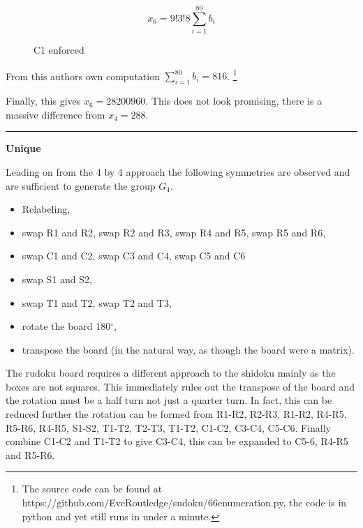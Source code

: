 \documentclass[a4paper,11pt]{report}
\newcounter{row}
\newcounter{col}
\newcommand\setrow[9]{
\setcounter{col}{1}
\foreach \n in {#1, #2, #3, #4, #5, #6, #7, #8, #9} {
\edef\x{\value{col} - 0.5}
\edef\y{9.5 - \value{row}}
\node[anchor=center] at (\x, \y) {\n};
\stepcounter{col}
}
\stepcounter{row}
}
\begin{document}
\begin{equation}x_6=9!3!8\sum^{80}_{i=1} b_i\end{equation}

\begin{figure}[h]
\centering
{}
\caption{C1 enforced}
\label{fig:64}
\end{figure}

From this authors own computation $\sum^{80}_{i=1} b_i=816$. \footnote{The source code can be found at https://github.com/EveRoutledge/sudoku/66enumeration.py, the code is in python and yet still runs in under a minute.}

Finally, this gives $x_6=28200960$. This does not look promising, there is a massive difference from $x_4=288$.

\noindent\rule{4cm}{0.4pt}

\textbf{Unique}

Leading on from the 4 by 4 approach the following symmetries are observed and are sufficient to generate the group $G_4$.
\begin{itemize}
\item Relabeling,
\item swap R1 and R2, swap R2 and R3, swap R4 and R5, swap R5 and R6,
\item swap C1 and C2, swap C3 and C4, swap C5 and C6
\item swap S1 and S2,
\item swap T1 and T2, swap T2 and T3,
\item rotate the board 180$^\circ$,
\item transpose the board (in the natural way, as though the board were a matrix).
\end{itemize}
The rudoku board requires a different approach to the shidoku mainly as the boxes are not squares. This immediately rules out the transpose of the board and the rotation must be a half turn not just a quarter turn. In fact, this can be reduced further the rotation can be formed from R1-R2, R2-R3, R1-R2, R4-R5, R5-R6, R4-R5, S1-S2, T1-T2, T2-T3, T1-T2, C1-C2, C3-C4, C5-C6. Finally combine C1-C2 and T1-T2 to give C3-C4, this can be expanded to C5-6, R4-R5 and R5-R6.
\end{document}
